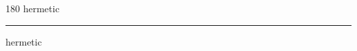 
\begin{frame}
\begin{center}
\begin{turn}{180}
{\fontsize{2.5cm}{1em}\selectfont hermetic}
\end{turn}
\vspace{1em}\par  
\hrule
\vspace{1em}\par  
{\fontsize{2.5cm}{1em}\selectfont hermetic}
\end{center}
\end{frame}
